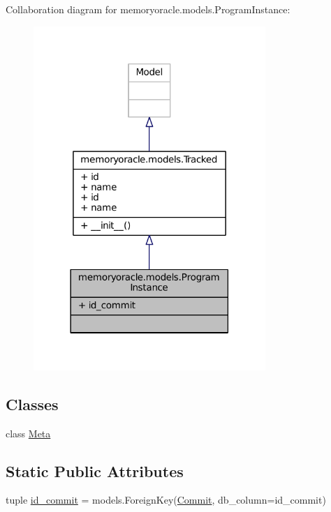 Collaboration diagram for memoryoracle.\+models.\+Program\+Instance\+:
\nopagebreak
\begin{figure}[H]
\begin{center}
\leavevmode
\includegraphics[width=249pt]{classmemoryoracle_1_1models_1_1ProgramInstance__coll__graph}
\end{center}
\end{figure}
\subsection*{Classes}
\begin{DoxyCompactItemize}
\item 
class \hyperlink{classmemoryoracle_1_1models_1_1ProgramInstance_1_1Meta}{Meta}
\end{DoxyCompactItemize}
\subsection*{Static Public Attributes}
\begin{DoxyCompactItemize}
\item 
tuple \hyperlink{classmemoryoracle_1_1models_1_1ProgramInstance_a9fc40c28ec43657e55c48317d7ccf375}{id\+\_\+commit} = models.\+Foreign\+Key(\textquotesingle{}\hyperlink{classmemoryoracle_1_1models_1_1Commit}{Commit}\textquotesingle{}, db\+\_\+column=\textquotesingle{}id\+\_\+commit\textquotesingle{})
\end{DoxyCompactItemize}
